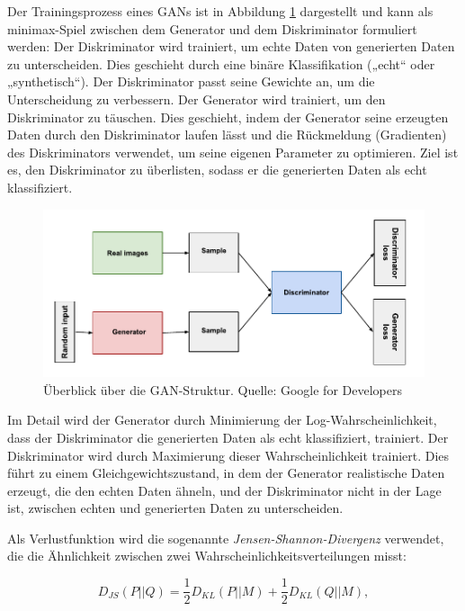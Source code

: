 Der Trainingsprozess eines GANs ist in Abbildung \ref{fig:gan} dargestellt und kann als minimax-Spiel zwischen dem Generator und dem Diskriminator formuliert werden: Der Diskriminator wird trainiert, um echte Daten von generierten Daten zu unterscheiden. Dies geschieht durch eine binäre Klassifikation („echt“ oder „synthetisch“). Der Diskriminator passt seine Gewichte an, um die Unterscheidung zu verbessern. Der Generator wird trainiert, um den Diskriminator zu täuschen. Dies geschieht, indem der Generator seine erzeugten Daten durch den Diskriminator laufen lässt und die Rückmeldung (Gradienten) des Diskriminators verwendet, um seine eigenen Parameter zu optimieren. Ziel ist es, den Diskriminator zu überlisten, sodass er die generierten Daten als echt klassifiziert.

\begin{figure}[h]
	\includegraphics[width=\textwidth]{figure_gan.pdf}
	\caption{Überblick über die GAN-Struktur. Quelle: Google for Developers}
	\label{fig:gan}
\end{figure}

Im Detail wird der Generator durch Minimierung der Log-Wahrscheinlichkeit, dass der Diskriminator die generierten Daten als echt klassifiziert, trainiert. Der Diskriminator wird durch Maximierung dieser Wahrscheinlichkeit trainiert. Dies führt zu einem Gleichgewichtszustand, in dem der Generator realistische Daten erzeugt, die den echten Daten ähneln, und der Diskriminator nicht in der Lage ist, zwischen echten und generierten Daten zu unterscheiden.

Als Verlustfunktion wird die sogenannte \textit{Jensen-Shannon-Divergenz} verwendet, die die Ähnlichkeit zwischen zwei Wahrscheinlichkeitsverteilungen misst:

\begin{equation}
	D_{JS}(P||Q) = \frac{1}{2} D_{KL}(P||M) + \frac{1}{2} D_{KL}(Q||M),
	\label{eq:js-divergence}
\end{equation}

